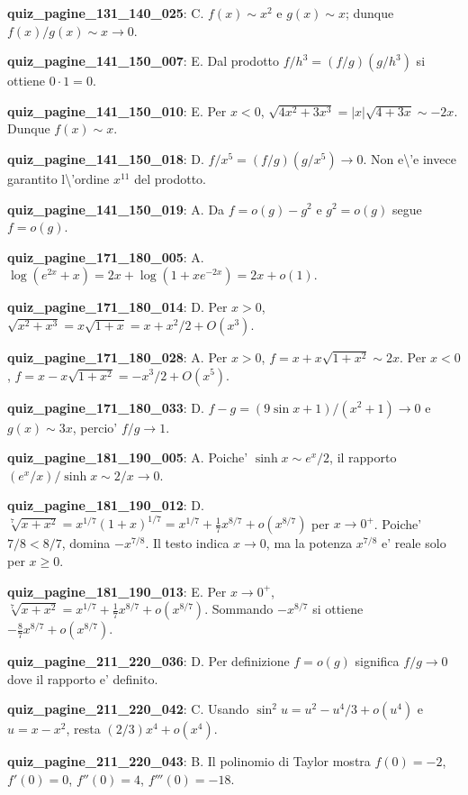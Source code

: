 \documentclass[11pt,a4paper]{article}
\newcounter{quiz}
\begin{document}
\noindent\textbf{quiz\_pagine\_131\_140\_025}: C. $f(x)\sim x^2$ e $g(x)\sim x$; dunque $f(x)/g(x)\sim x\to0$.\par\medskip
\noindent\textbf{quiz\_pagine\_141\_150\_007}: E. Dal prodotto $f/h^3=(f/g)(g/h^3)$ si ottiene $0\cdot1=0$.\par\medskip
\noindent\textbf{quiz\_pagine\_141\_150\_010}: E. Per $x<0$, $\sqrt{4x^2+3x^3}=|x|\sqrt{4+3x}\sim-2x$. Dunque $f(x)\sim x$.\par\medskip
\noindent\textbf{quiz\_pagine\_141\_150\_018}: D. $f/x^5=(f/g)(g/x^5)\to0$. Non e\textbackslash{}'e invece garantito l\textbackslash{}'ordine $x^{11}$ del prodotto.\par\medskip
\noindent\textbf{quiz\_pagine\_141\_150\_019}: A. Da $f=o(g)-g^2$ e $g^2=o(g)$ segue $f=o(g)$.\par\medskip
\noindent\textbf{quiz\_pagine\_171\_180\_005}: A. $\log(e^{2x}+x)=2x+\log(1+xe^{-2x})=2x+o(1)$.\par\medskip
\noindent\textbf{quiz\_pagine\_171\_180\_014}: D. Per $x>0$, $\sqrt{x^2+x^3}=x\sqrt{1+x}=x+x^2/2+O(x^3)$.\par\medskip
\noindent\textbf{quiz\_pagine\_171\_180\_028}: A. Per $x>0$, $f=x+x\sqrt{1+x^2}\sim2x$. Per $x<0$, $f=x-x\sqrt{1+x^2}=-x^3/2+O(x^5)$.\par\medskip
\noindent\textbf{quiz\_pagine\_171\_180\_033}: D. $f-g=(9\sin x+1)/(x^2+1)\to0$ e $g(x)\sim3x$, percio' $f/g\to1$.\par\medskip
\noindent\textbf{quiz\_pagine\_181\_190\_005}: A. Poiche' $\sinh x\sim e^x/2$, il rapporto $(e^x/x)/\sinh x\sim2/x\to0$.\par\medskip
\noindent\textbf{quiz\_pagine\_181\_190\_012}: D. $\sqrt[7]{x+x^2}=x^{1/7}(1+x)^{1/7}=x^{1/7}+\frac17x^{8/7}+o(x^{8/7})$ per $x\to0^+$. Poiche' $7/8<8/7$, domina $-x^{7/8}$. Il testo indica $x\to0$, ma la potenza $x^{7/8}$ e' reale solo per $x\geq0$.\par\medskip
\noindent\textbf{quiz\_pagine\_181\_190\_013}: E. Per $x\to0^+$, $\sqrt[7]{x+x^2}=x^{1/7}+\frac17x^{8/7}+o(x^{8/7})$. Sommando $-x^{8/7}$ si ottiene $-\frac87x^{8/7}+o(x^{8/7})$.\par\medskip
\noindent\textbf{quiz\_pagine\_211\_220\_036}: D. Per definizione $f=o(g)$ significa $f/g\to0$ dove il rapporto e' definito.\par\medskip
\noindent\textbf{quiz\_pagine\_211\_220\_042}: C. Usando $\sin^2u=u^2-u^4/3+o(u^4)$ e $u=x-x^2$, resta $(2/3)x^4+o(x^4)$.\par\medskip
\noindent\textbf{quiz\_pagine\_211\_220\_043}: B. Il polinomio di Taylor mostra $f(0)=-2$, $f'(0)=0$, $f''(0)=4$, $f'''(0)=-18$.\par\medskip
\end{document}
